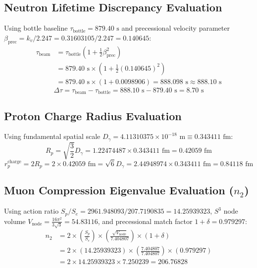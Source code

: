 \documentclass[11pt,a4paper]{article}
\begin{document}
	\subsection{Neutron Lifetime Discrepancy Evaluation}
	Using bottle baseline $\tau_{\text{bottle}} = 879.40\text{ s}$ and precessional velocity parameter $\beta_{\text{prec}} = k_v / 2.247 = 0.31603105 / 2.247 = 0.140645$:
	\begin{align}
		\tau_{\text{beam}} &= \tau_{\text{bottle}} \left(1 + \frac{1}{2} \beta_{\text{prec}}^2\right) \nonumber \\
		&= 879.40\text{ s} \times \left(1 + \frac{1}{2}(0.140645)^2\right) \nonumber \\
		&= 879.40\text{ s} \times (1 + 0.0098906) = 888.098\text{ s} \approx 888.10\text{ s}
	\end{align}
	\begin{equation}
		\Delta\tau = \tau_{\text{beam}} - \tau_{\text{bottle}} = 888.10\text{ s} - 879.40\text{ s} = 8.70\text{ s}
	\end{equation}
	
	\subsection{Proton Charge Radius Evaluation}
	Using fundamental spatial scale $D_\gamma = 4.11310375 \times 10^{-18}\text{ m} \equiv 0.343411\text{ fm}$:
	\begin{equation}
		R_p = \sqrt{\frac{3}{2}} D_\gamma = 1.22474487 \times 0.343411\text{ fm} = 0.42059\text{ fm}
	\end{equation}
	\begin{equation}
		r_p^{\text{charge}} = 2 R_p = 2 \times 0.42059\text{ fm} = \sqrt{6} D_\gamma = 2.44948974 \times 0.343411\text{ fm} = 0.84118\text{ fm}
	\end{equation}
	
	\subsection{\texorpdfstring{Muon Compression Eigenvalue Evaluation ($n_2$)}{Muon Compression Eigenvalue Evaluation (n\_2)}}
	Using action ratio $S_p/S_e = 2961.948093 / 207.7190835 = 14.25939323$, $S^3$ node volume $V_{\text{node}} = \frac{16\pi^2}{3\sqrt{3}} = 54.83116$, and precessional match factor $1+\delta = 0.979297$:
	\begin{align}
		n_2 &= 2 \times \left(\frac{S_p}{S_e}\right) \times \left(\frac{\sqrt{V_{\text{node}}}}{7.404807}\right) \times (1+\delta) \nonumber \\
		&= 2 \times (14.25939323) \times \left(\frac{7.404807}{7.404807}\right) \times (0.979297) \nonumber \\
		&= 2 \times 14.25939323 \times 7.250239 = 206.76828
	\end{align}
	
\end{document}
